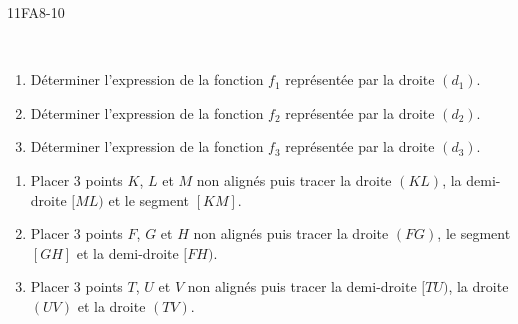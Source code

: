\documentclass[a4paper,12pt]{report}
\begin{document}
\begin{EXO}{}{11FA8-10}
\begin{tikzpicture}[baseline,scale = 0.75]
\end{tikzpicture}\\
\begin{enumerate}[]
	\item Déterminer l'expression de la fonction $f_1$ représentée par la droite $(d_1)$.
	\item Déterminer l'expression de la fonction $f_2$ représentée par la droite $(d_2)$.
	\item Déterminer l'expression de la fonction $f_3$ représentée par la droite $(d_3)$.
\end{enumerate}
\end{EXO}


\clearpage

\begin{Correction}
\begin{EXO}{}{}
\begin{multicols}{2}

\begin{enumerate}[]
\item \begin{minipage}[t]{\linewidth}Placer 3 points $K$, $L$ et $M$ non alignés puis tracer la droite $(KL)$, la demi-droite $[ML)$ et le segment $[KM]$.\end{minipage}
\item \begin{minipage}[t]{\linewidth}Placer 3 points $F$, $G$ et $H$ non alignés puis tracer la droite $(FG)$, le segment $[GH]$ et la demi-droite $[FH)$.\end{minipage}
\item \begin{minipage}[t]{\linewidth}Placer 3 points $T$, $U$ et $V$ non alignés puis tracer la demi-droite $[TU)$, la droite $(UV)$ et la droite $(TV)$.\end{minipage}
\end{enumerate}
\end{multicols}

\end{EXO}

\begin{EXO}{}{}
\begin{multicols}{2}


\end{multicols}
\end{EXO}
\end{Correction}
\end{document}
